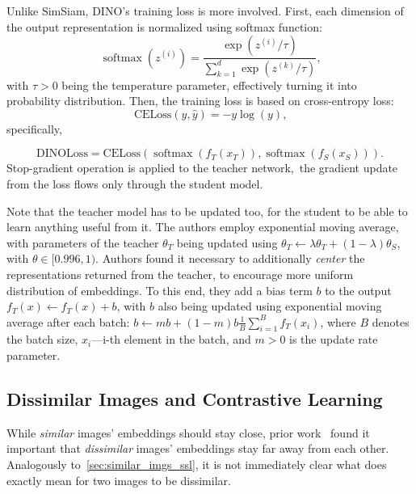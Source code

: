 Unlike SimSiam, DINO's training loss is more involved. First, each dimension of the output representation is normalized using softmax function:
\begin{equation}
    \operatorname{softmax}(z^{(i)})=\frac{\exp(z^{(i)}/\tau)}{\sum_{k=1}^{d}\exp(z^{(k)}/\tau)}\text{,} 
    \label{eq:softmax}
\end{equation}
with $\tau>0$ being the temperature parameter, effectively turning it into probability distribution. Then, the training loss is based on cross-entropy loss:
\begin{equation}
    \text{CELoss}(y,\hat{y})=-y\log(y)\text{,} 
    \label{eq:celoss}   
\end{equation}
specifically, 

\begin{equation}
    \text{DINOLoss}=\text{CELoss}\left(\operatorname{softmax}\left(f_T\left(x_T\right)\right),\operatorname{softmax}\left(f_S\left(x_S\right)\right)\right)\text{.} 
\end{equation}
Stop-gradient operation is applied to the teacher network,~\ie the gradient update from the loss flows only through the student model. 

Note that the teacher model has to be updated too, for the student to be able to learn anything useful from it. The authors employ exponential moving average, with parameters of the teacher $\theta_T$ being updated using $\theta_T\leftarrow\lambda\theta_T+(1-\lambda)\theta_S$, with $\theta\in[0.996,1)$. Authors found it necessary to additionally \textit{center} the representations returned from the teacher, to encourage more uniform distribution of embeddings. To this end, they add a bias term $b$ to the output $f_T(x)\leftarrow f_T(x)+b$, with $b$ also being updated using exponential moving average after each batch: $b\leftarrow mb+(1-m)b\frac{1}{B}\sum_{i=1}^{B}f_T(x_i)$, where $B$ denotes the batch size, $x_i$---i-th element in the batch, and $m>0$ is the update rate parameter.

\subsection{Dissimilar Images and Contrastive Learning}

While \textit{similar} images' embeddings should stay close, prior work~\cite{simclr,clip} found it important that \textit{dissimilar} images' embeddings stay far away from each other. Analogously to~\cref{sec:similar_imgs_ssl}, it is not immediately clear what does exactly mean for two images to be dissimilar. 

